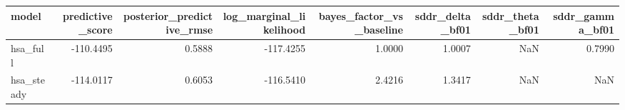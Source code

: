 \begin{tabular}{lrrrrrrr}
\toprule
model & predictive\_score & posterior\_predictive\_rmse & log\_marginal\_likelihood & bayes\_factor\_vs\_baseline & sddr\_delta\_bf01 & sddr\_theta\_bf01 & sddr\_gamma\_bf01 \\
\midrule
hsa\_full & -110.4495 & 0.5888 & -117.4255 & 1.0000 & 1.0007 & NaN & 0.7990 \\
hsa\_steady & -114.0117 & 0.6053 & -116.5410 & 2.4216 & 1.3417 & NaN & NaN \\
\bottomrule
\end{tabular}
